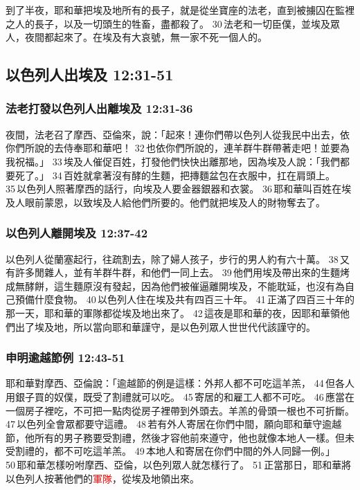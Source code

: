 到了半夜，耶和華把埃及地所有的長子，就是從坐寶座的法老，直到被擄囚在監裡之人的長子，以及一切頭生的牲畜，盡都殺了。 30 法老和一切臣僕，並埃及眾人，夜間都起來了。在埃及有大哀號，無一家不死一個人的。

\subsection{以色列人出埃及 12:31-51}
\subsubsection{法老打發以色列人出離埃及 12:31-36}
夜間，法老召了摩西、亞倫來，說：「起來！連你們帶以色列人從我民中出去，依你們所說的去侍奉耶和華吧！ 32 也依你們所說的，連羊群牛群帶著走吧！並要為我祝福。」 33 埃及人催促百姓，打發他們快快出離那地，因為埃及人說：「我們都要死了。」 34 百姓就拿著沒有酵的生麵，把摶麵盆包在衣服中，扛在肩頭上。 35 以色列人照著摩西的話行，向埃及人要金器銀器和衣裳。 36 耶和華叫百姓在埃及人眼前蒙恩，以致埃及人給他們所要的。他們就把埃及人的財物奪去了。


\subsubsection{以色列人離開埃及 12:37-42}
以色列人從蘭塞起行，往疏割去，除了婦人孩子，步行的男人約有六十萬。 38 又有許多閒雜人，並有羊群牛群，和他們一同上去。 39 他們用埃及帶出來的生麵烤成無酵餅，這生麵原沒有發起，因為他們被催逼離開埃及，不能耽延，也沒有為自己預備什麼食物。 40 以色列人住在埃及共有四百三十年。 41 正滿了四百三十年的那一天，耶和華的軍隊都從埃及地出來了。 42 這夜是耶和華的夜，因耶和華領他們出了埃及地，所以當向耶和華謹守，是以色列眾人世世代代該謹守的。


\subsubsection{申明逾越節例 12:43-51}
耶和華對摩西、亞倫說：「逾越節的例是這樣：外邦人都不可吃這羊羔， 44 但各人用銀子買的奴僕，既受了割禮就可以吃。 45 寄居的和雇工人都不可吃。 46 應當在一個房子裡吃，不可把一點肉從房子裡帶到外頭去。羊羔的骨頭一根也不可折斷。 47 以色列全會眾都要守這禮。 48 若有外人寄居在你們中間，願向耶和華守逾越節，他所有的男子務要受割禮，然後才容他前來遵守，他也就像本地人一樣。但未受割禮的，都不可吃這羊羔。 49 本地人和寄居在你們中間的外人同歸一例。」 50 耶和華怎樣吩咐摩西、亞倫，以色列眾人就怎樣行了。 51 正當那日，耶和華將以色列人按著他們的\textcolor{red}{軍隊}，從埃及地領出來。


